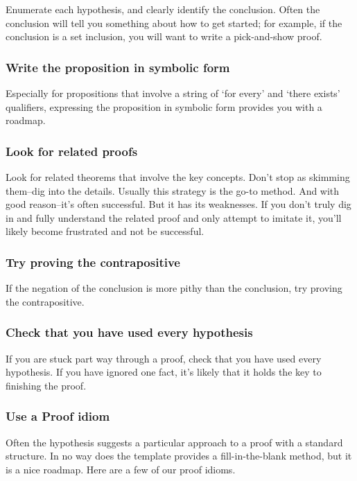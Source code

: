 \documentclass[12pt,fleqn]{article}
\newcounter{ex}\setcounter{ex}{0}
\newcounter{id}\setcounter{id}{0}
\newcounter{se}\setcounter{se}{0}
\begin{document}
 Enumerate each hypothesis, and clearly
 identify the conclusion.  Often the conclusion will tell you something about how
 to get started; for example, if the conclusion is a set inclusion, you will want
 to write a pick-and-show proof.

 \subsubsection{Write the proposition in symbolic form} 
 
 Especially for propositions 
 that involve a string of `for every' and `there exists' qualifiers,
 expressing the proposition in symbolic form provides you with 
 a roadmap.

 \subsubsection{Look for related proofs} 
 
 Look for related theorems that involve the key concepts. Don't stop
 as skimming them--dig into the details. Usually this strategy is the go-to 
 method. And with good reason--it's often successful. But it has its 
 weaknesses. If you don't truly dig in and fully understand the related
 proof and only attempt to imitate it, you'll likely  become frustrated and 
 not be successful. 

 \subsubsection{Try proving the contrapositive} 
 
 If the negation of the conclusion is 
 more pithy than the conclusion, try proving the contrapositive.


 \subsubsection{Check that you have used every hypothesis}

 If you are stuck part way through a proof, check that you have
 used every hypothesis.  If you have ignored one fact,  it's likely
 that it holds the key to finishing the proof.
 
 

\subsubsection{Use a  Proof idiom}

Often the hypothesis suggests a particular approach to a proof with a standard structure.  In no way does
the template provides a fill-in-the-blank method, but it is a nice roadmap.  
Here are a few of our proof idioms.
\end{document}
